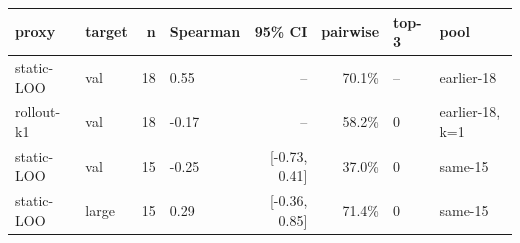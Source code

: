 \begin{tabular}{llrlrrlp{2.2cm}}
\toprule
proxy & target & n & Spearman & 95\% CI & pairwise & top-3 & pool \\
\midrule
static-LOO & val & 18 & 0.55 & -- & 70.1\% & -- & earlier-18 \\
rollout-k1 & val & 18 & -0.17 & -- & 58.2\% & 0 & earlier-18, k=1 \\
static-LOO & val & 15 & -0.25 & [-0.73, 0.41] & 37.0\% & 0 & same-15 \\
static-LOO & large & 15 & 0.29 & [-0.36, 0.85] & 71.4\% & 0 & same-15 \\
\bottomrule
\end{tabular}
